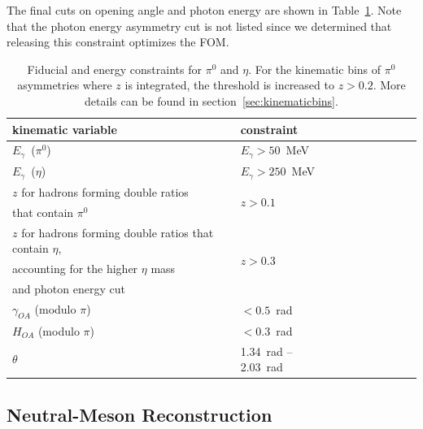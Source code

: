 The final cuts on opening angle and photon energy are shown in Table~\ref{tab:constrain}. Note that the photon energy asymmetry cut is not listed since we determined that releasing this constraint optimizes the FOM.

\begin{table}[H]\small
\centering
\begin{tabular}{|l|l|l|l|l|l|l|l|l|}
\hline
kinematic variable & constraint   \\ \hline
$E_\gamma$~($\pi^0$) & $E_\gamma >50$~MeV \\ \hline
$E_\gamma$~($\eta$) & $E_\gamma >250$~MeV \\ \hline
$z$  for hadrons forming double ratios &\multirow{2}{*}{$z>0.1$}\\
 that contain $\pi^0$&  \\ \hline
$z$ for hadrons forming double ratios that contain $\eta$,& \multirow{3}{*}{$z>0.3$} \\ accounting for the higher $\eta$ mass &\\and photon energy cut & \\ \hline
$\gamma_{OA}$ (modulo $\pi$) & $<0.5$~rad \\ \hline
$H_{OA}$ (modulo $\pi$) & $<0.3$~rad \\ \hline
$\theta$ &  1.34~rad  --  2.03~rad  \\ \hline
\end{tabular}
\caption{Fiducial and energy constraints for $\pi^0$ and $\eta$.
For the kinematic bins of $\pi^0$ asymmetries where $z$ is  integrated, the threshold is increased to $z>0.2$. More details can be found in section~\ref{sec:kinematicbins}.
}
\label{tab:constrain}
\end{table}

\subsection{Neutral-Meson Reconstruction}
\label{sec:neutralmesonreconstruction}

